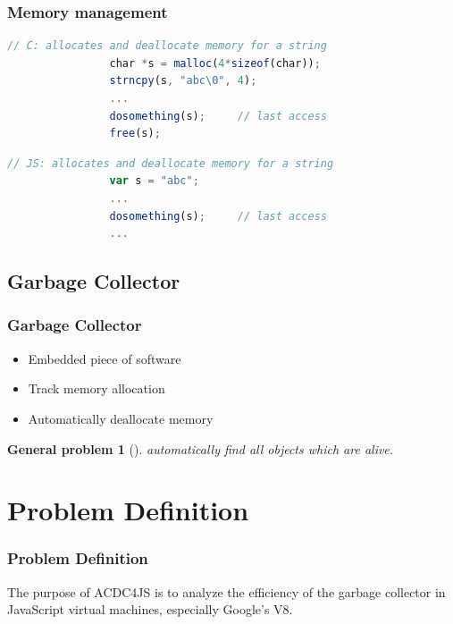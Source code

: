 \documentclass[xcolor=x11names,compress]{beamer}
\begin{document}
	\begin{frame}[fragile]
		\frametitle{Memory management}
			\begin{lstlisting}[language=JavaScript]
				// C: allocates and deallocate memory for a string
				char *s = malloc(4*sizeof(char));
				strncpy(s, "abc\0", 4);
				...
				dosomething(s);		// last access
				free(s);
			\end{lstlisting}			
			
			\pause
			
			\begin{lstlisting}[language=JavaScript]
				// JS: allocates and deallocate memory for a string
				var s = "abc";
				...
				dosomething(s);		// last access
				...
			\end{lstlisting}	
			
	\end{frame}
	
	\subsection{Garbage Collector} 
	\begin{frame}
		\frametitle{Garbage Collector}
		\begin{itemize}
			\item Embedded piece of software
			\item Track memory allocation
			\item Automatically deallocate memory  
		\end{itemize}
		\newtheorem{general problem}{General problem}
		\begin{general problem}[] \label{gp:garbage_collector}
			automatically find all objects which are alive.
		\end{general problem}
	\end{frame}
	
	\section{Problem Definition} 
	\begin{frame}
		\frametitle{Problem Definition}
		The purpose of ACDC4JS is to analyze the efficiency of the garbage collector in JavaScript virtual machines, especially Google's V8.
	\end{frame}
	
\end{document}
